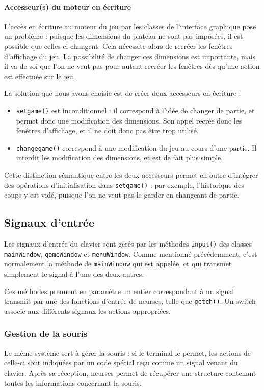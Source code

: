 \documentclass[11pt,a4paper]{article}
\begin{document}
\paragraph{Accesseur(s) du moteur en écriture}
L'accès en écriture au moteur du jeu par les classes de l'interface graphique pose un problème : puisque les dimensions du plateau ne sont pas imposées, il est possible que celles-ci changent. Cela nécessite alors de recréer les fenêtres d'affichage du jeu. La possibilité de changer ces dimensions est importante, mais il va de soi que l'on ne veut pas pour autant recréer les fenêtres dès qu'une action est effectuée sur le jeu.

La solution que nous avons choisie est de créer deux accesseurs en écriture :
\begin{itemize}
\item 
\verb"setgame()" est inconditionnel : il correspond à l'idée de changer de partie, et permet donc une modification des dimensions. Son appel recrée donc les fenêtres d'affichage, et il ne doit donc pas être trop utilisé.
\item
\verb"changegame()" correspond à une modification du jeu au cours d'une partie. Il interdit les modification des dimensions, et est de fait plus simple.
\end{itemize}

Cette distinction sémantique entre les deux accesseurs permet en outre d'intégrer des opérations d'initialisation dans \verb"setgame()" : par exemple, l'historique des coups y est vidé, puisque l'on ne veut pas le garder en changeant de partie.

\subsection{Signaux d'entrée}
Les signaux d'entrée du clavier sont gérés par les méthodes \verb"input()" des classes \verb"mainWindow", \verb"gameWindow" et \verb"menuWindow". Comme mentionné précédemment, c'est normalement la méthode de \verb"mainWindow" qui est appelée, et qui transmet simplement le signal à l'une des deux autres.

Ces méthodes prennent en paramètre un entier correspondant à un signal transmit par une des fonctions d'entrée de ncurses, telle que \verb"getch()". Un switch associe aux différents signaux les actions appropriées.

\subsubsection{Gestion de la souris}
Le même système sert à gérer la souris : si le terminal le permet, les actions de celle-ci sont indiquées par un code spécial reçu comme un signal venant du clavier. Après sa réception, ncurses permet de récupérer une structure contenant toutes les informations concernant la souris.
\end{document}
